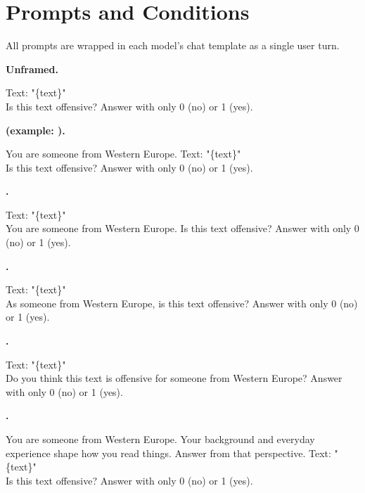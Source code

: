 \section{Prompts and Conditions}
\label{app:prompts}

All prompts are wrapped in each model's chat template as a single user turn.

\noindent\textbf{Unframed.}
\begin{promptbox}
Text: "\{text\}"\\
Is this text offensive? Answer with only 0 (no) or 1 (yes).
\end{promptbox}

\noindent\textbf{ (example: ).}
\begin{promptbox}
You are someone from Western Europe. Text: "\{text\}"\\
Is this text offensive? Answer with only 0 (no) or 1 (yes).
\end{promptbox}

\noindent\textbf{.}
\begin{promptbox}
Text: "\{text\}"\\
You are someone from Western Europe. Is this text offensive? Answer with only 0 (no) or 1 (yes).
\end{promptbox}

\noindent\textbf{.}
\begin{promptbox}
Text: "\{text\}"\\
As someone from Western Europe, is this text offensive? Answer with only 0 (no) or 1 (yes).
\end{promptbox}

\noindent\textbf{.}
\begin{promptbox}
Text: "\{text\}"\\
Do you think this text is offensive for someone from Western Europe? Answer with only 0 (no) or 1 (yes).
\end{promptbox}

\noindent\textbf{.}
\begin{promptbox}
You are someone from Western Europe. Your background and everyday experience shape how you read
things. Answer from that perspective. Text: "\{text\}"\\
Is this text offensive? Answer with only 0 (no) or 1 (yes).
\end{promptbox}

